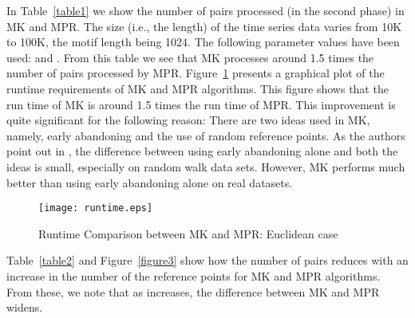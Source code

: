 \documentclass{article}
\theoremstyle{definition}
\theoremstyle{remark}
\begin{document}
In Table~\ref{table1} we show the number of pairs processed (in the second phase) in MK and MPR.  The size (i.e., the length)
 of the time series data varies from 10K to 100K, the motif length being 1024. The following parameter values have been used:  and .
 From this table we see that MK processes around 1.5 times the number of pairs processed by MPR.
Figure~\ref{figure2} presents a graphical plot of the runtime requirements of MK and MPR algorithms. This figure shows that the run time of MK is around 1.5 times the run time of MPR. This improvement is quite significant for the following reason: There are two ideas used in MK, namely, early abandoning and the use of random reference points. As the authors point out in \cite{AEQSB09}, the difference between using early abandoning alone and both the ideas is small, especially on random walk data sets. However, MK performs much better than using early abandoning alone on real datasets.

\begin{figure}[h]
\texttt{[image: runtime.eps]}
\caption{Runtime Comparison between MK and MPR: Euclidean case}\label{figure2}
\end{figure}

Table~\ref{table2} and Figure~\ref{figure3} show how the number of pairs  reduces with an increase in the number  of the reference points for MK and MPR algorithms. From these, we note that as  increases, the difference between MK and MPR widens.
\end{document}
